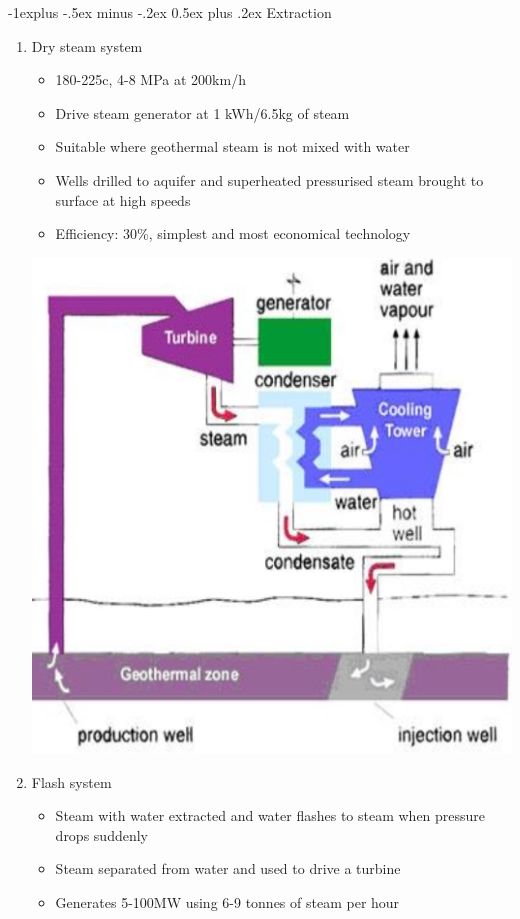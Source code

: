 \documentclass{article}
\makeatletter
\renewcommand{\subsection}{\@startsection{subsection}{2}{0mm}%
    {-1explus -.5ex minus -.2ex}%
    {0.5ex plus .2ex}%
{\normalfont\normalsize\bfseries}}
\makeatother
\begin{document}
\begin{multicols*}{4}
\subsection{Extraction}
\begin{enumerate}
	\item Dry steam system
	\begin{itemize}
		\item 180-225c, 4-8 MPa at 200km/h
		\item Drive steam generator at 1 kWh/6.5kg of steam
		\item Suitable where geothermal steam is not mixed with water
		\item Wells drilled to aquifer and superheated pressurised steam brought to surface at high speeds
		\item Efficiency: 30\%, simplest and most economical technology
	\end{itemize}
	\includegraphics[scale=0.28]{dry-steam}
	\item Flash system
	\begin{itemize}
		\item Steam with water extracted and water flashes to steam when pressure drops suddenly
		\item Steam separated from water and used to drive a turbine
		\item Generates 5-100MW using 6-9 tonnes of steam per hour

\end{itemize}
\end{enumerate}
\end{multicols*}
\end{document}

